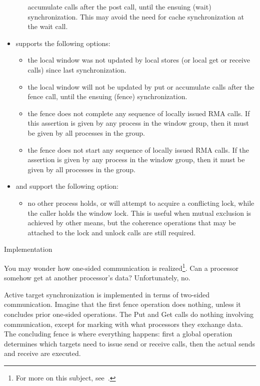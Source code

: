 \begin{itemize}
\begin{itemize}
    accumulate calls after the post call, until the ensuing (wait)
    synchronization. This may avoid the need for cache synchronization
    at the wait call.
  \end{itemize}
\item {} supports the following options:
  \begin{itemize}
  \item {} the local window was not updated by local
    stores (or local get or receive calls) since last synchronization.
  \item {} the local window will not be updated by put or
    accumulate calls after the fence call, until the ensuing (fence)
    synchronization.
  \item {} the fence does not complete any sequence of
    locally issued RMA calls. If this assertion is given by any
    process in the window group, then it must be given by all
    processes in the group.
  \item {} the fence does not start any
    sequence of locally issued RMA calls. If the assertion is given by
    any process in the window group, then it must be given by all
    processes in the group.
  \end{itemize}
\item {} and 
  support the following option:
  \begin{itemize}
    \item {} no other process holds, or will attempt to
    acquire a conflicting lock, while the caller holds the window
    lock. This is useful when mutual exclusion is achieved by other
    means, but the coherence operations that may be attached to the
    lock and unlock calls are still required.
  \end{itemize}
\end{itemize}

 {Implementation}

You may wonder how one-sided communication is realized\footnote{For
  more on this subject, see~\cite{thakur:ijhpca-sync}.}. Can a processor
somehow get at another processor's data? Unfortunately, no.

Active target synchronization is implemented in terms of two-sided communication.
Imagine that the first fence operation does nothing, unless it concludes prior
one-sided operations. The Put and Get calls do nothing involving communication,
except for marking with what processors they exchange data.
The concluding fence is where everything happens: first a global operation
determines which targets need to issue send or receive calls, then the
actual sends and receive are executed.

